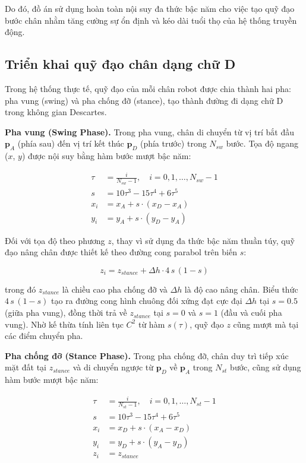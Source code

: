 Do đó, đồ án sử dụng hoàn toàn nội suy đa thức bậc năm cho việc tạo quỹ đạo bước chân nhằm tăng cường sự ổn định và kéo dài tuổi thọ của hệ thống truyền động.

\subsection{Triển khai quỹ đạo chân dạng chữ D}

Trong hệ thống thực tế, quỹ đạo của mỗi chân robot được chia thành hai pha: pha vung (swing) và pha chống đỡ (stance), tạo thành đường đi dạng chữ D trong không gian Descartes.

\textbf{Pha vung (Swing Phase).} Trong pha vung, chân di chuyển từ vị trí bắt đầu $\mathbf{p}_A$ (phía sau) đến vị trí kết thúc $\mathbf{p}_D$ (phía trước) trong $N_{sw}$ bước. Tọa độ ngang ($x$, $y$) được nội suy bằng hàm bước mượt bậc năm:

\begin{align}
\tau &= \frac{i}{N_{sw} - 1}, \quad i = 0, 1, \ldots, N_{sw}-1 \\
s &= 10\tau^3 - 15\tau^4 + 6\tau^5 \\
x_i &= x_A + s \cdot (x_D - x_A) \\
y_i &= y_A + s \cdot (y_D - y_A)
\end{align}

Đối với tọa độ theo phương $z$, thay vì sử dụng đa thức bậc năm thuần túy, quỹ đạo nâng chân được thiết kế theo đường cong parabol trên biến $s$:

\begin{equation}
z_i = z_{stance} + \Delta h \cdot 4\,s\,(1 - s)
\label{eq:z_parabolic}
\end{equation}

trong đó $z_{stance}$ là chiều cao pha chống đỡ và $\Delta h$ là độ cao nâng chân. Biểu thức $4\,s\,(1-s)$ tạo ra đường cong hình chuông đối xứng đạt cực đại $\Delta h$ tại $s = 0.5$ (giữa pha vung), đồng thời trả về $z_{stance}$ tại $s = 0$ và $s = 1$ (đầu và cuối pha vung). Nhờ kế thừa tính liên tục $C^2$ từ hàm $s(\tau)$, quỹ đạo $z$ cũng mượt mà tại các điểm chuyển pha.

\textbf{Pha chống đỡ (Stance Phase).} Trong pha chống đỡ, chân duy trì tiếp xúc mặt đất tại $z_{stance}$ và di chuyển ngược từ $\mathbf{p}_D$ về $\mathbf{p}_A$ trong $N_{st}$ bước, cũng sử dụng hàm bước mượt bậc năm:

\begin{align}
\tau &= \frac{i}{N_{st} - 1}, \quad i = 0, 1, \ldots, N_{st}-1 \\
s &= 10\tau^3 - 15\tau^4 + 6\tau^5 \\
x_i &= x_D + s \cdot (x_A - x_D) \\
y_i &= y_D + s \cdot (y_A - y_D) \\
z_i &= z_{stance}
\end{align}

